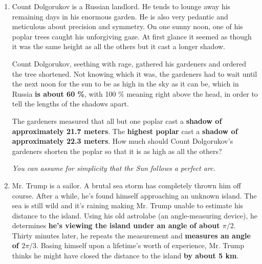 \documentclass[a4paper,11pt]{article}
\begin{document}
\begin{enumerate}
 \item Count Dolgorukov is a Russian landlord. He tends to lounge away his
  remaining days in his enormous garden. He is also very pedantic and meticulous
  about precision and symmetry. On one sunny noon, one of his poplar trees
  caught his unforgiving gaze. At first glance it seemed as though it was the
  same height as all the others but it cast a longer shadow.

  Count Dolgorukov, seething with rage, gathered his gardeners and ordered the
  tree shortened. Not knowing which it was, the gardeners had to wait until the
  next noon for the sun to be as high in the sky as it can be, which in Russia
  \textbf{is about 60 \%}, with 100 \% meaning right above the head, in order to
  tell the lengths of the shadows apart.
 
  The gardeners measured that all but one poplar cast a \textbf{shadow of
  approximately 21.7 meters}. The \textbf{highest poplar} cast a \textbf{shadow
  of approximately 22.3 meters}. How much should Count Dolgorukov's gardeners
  shorten the poplar so that it is as high as all the others?
 
  \emph{You can assume for simplicity that the Sun follows a perfect arc.}
 
  \begin{center}
  \end{center}
 \item Mr. Trump is a sailor. A brutal sea storm has completely thrown him off
  course. After a while, he's found himself approaching an unknown island. The
  sea is still wild and it's raining making Mr. Trump unable to estimate his
  distance to the island. Using his old astrolabe (an angle-measuring device),
  he determines \textbf{he's viewing the island under an angle of about $\pi /
  2$}. Thirty minutes later, he repeats the measurement and \textbf{measures an
  angle of $2\pi / 3$}. Basing himself upon a lifetime's worth of experience,
  Mr. Trump thinks he might have closed the distance to the island \textbf{by
  about 5 km}.
  

\end{enumerate}
\end{document}
